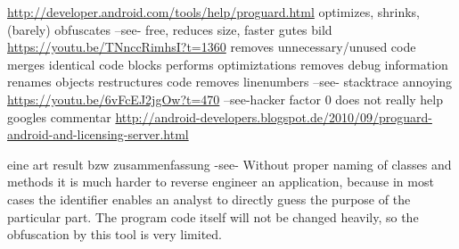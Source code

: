 \url{http://developer.android.com/tools/help/proguard.html}\newline
optimizes, shrinks, (barely) obfuscates --see- free, reduces size, faster\newline
gutes bild \url{https://youtu.be/TNnccRimhsI?t=1360}\newline
removes unnecessary/unused code\newline
merges identical code blocks\newline
performs optimiztations\newline
removes debug information\newline
renames objects\newline
restructures code\newline
removes linenumbers --see- stacktrace annoying\newline
\url{https://youtu.be/6vFcEJ2jgOw?t=470}\newline
--see-hacker factor 0\newline
does not really help\newline
googles commentar \url{http://android-developers.blogspot.de/2010/09/proguard-android-and-licensing-server.html}\newline

eine art result bzw zusammenfassung -see- Without proper naming of classes and methods it is much harder to reverse engineer an application, because in most cases the identifier enables an analyst to directly guess the purpose of the particular part. The program code itself will not be changed heavily, so the obfuscation by this tool is very limited.
